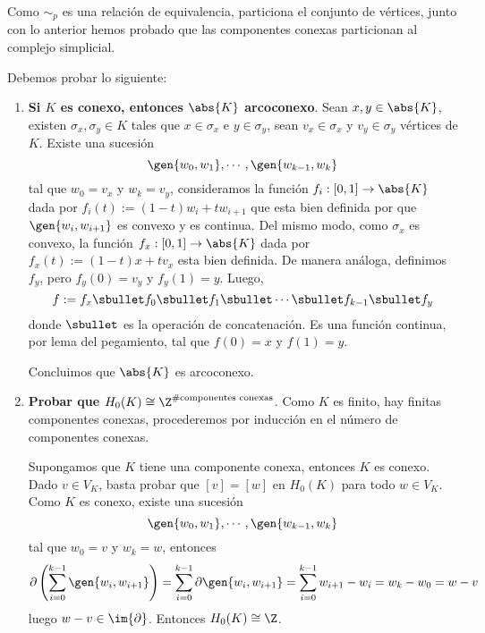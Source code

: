 \documentclass{article}
\begin{document}
\vspace{1mm}
\noindent Como $\sim_{p}$ es una relación de equivalencia, particiona el conjunto de vértices,
junto con lo anterior hemos probado que las componentes conexas particionan al complejo 
simplicial.

\vspace{2mm}
\noindent Debemos probar lo siguiente:
\begin{enumerate}
    \item\textbf{Si $K$ es conexo, entonces $\abs{K}$ arcoconexo}. Sean $x,y\in\abs{K}$, 
    existen $\sigma_{x},\sigma_{y}\in K$ tales que $x\in\sigma_{x}$ e $y\in\sigma_{y}$, sean 
    $v_{x}\in\sigma_{x}$ y $v_{y}\in\sigma_{y}$ vértices de $K$. Existe una sucesión
    \begin{equation*}
        \gen{w_{0},w_{1}},\cdots,\gen{w_{k-1},w_{k}}
    \end{equation*}
    tal que $w_{0}=v_{x}$ y $w_{k}=v_{y}$, consideramos la función $f_{i}:[0,1]\to\abs{K}$ dada 
    por $f_{i}(t):=(1-t)w_{i}+tw_{i+1}$ que esta bien definida por que $\gen{w_{i},w_{i+1}}$ es 
    convexo y es continua. Del mismo modo, como $\sigma_{x}$ es convexo, la función 
    $f_{x}:[0,1]\to\abs{K}$ dada por $f_{x}(t):=(1-t)x+tv_{x}$ esta bien definida. De manera
    análoga, definimos $f_{y}$, pero $f_{y}(0)=v_{y}$ y $f_{y}(1)=y$. Luego,
    \begin{equation*}
        f:=f_{x}\sbullet f_{0}\sbullet f_{1}\sbullet\cdots\sbullet f_{k-1}\sbullet f_{y}
    \end{equation*}
    donde $\sbullet$ es la operación de concatenación. Es una función continua, por lema del 
    pegamiento, tal que $f(0)=x$ y $f(1)=y$.
    
    \vspace{1mm}
    Concluimos que $\abs{K}$ es arcoconexo.
    
    \item\textbf{Probar que $H_{0}(K)\cong\Z^{\text{\#componentes conexas}}$}. Como $K$ es 
    finito, hay finitas componentes conexas, procederemos por inducción en el número de 
    componentes conexas.

    \vspace{1mm}
    Supongamos que $K$ tiene una componente conexa, entonces $K$ es conexo. Dado $v\in V_{K}$, 
    basta probar que $[v]=[w]$ en $H_{0}(K)$ para todo $w\in V_{K}$. Como $K$ es conexo, existe
    una sucesión
    \begin{equation*}
        \gen{w_{0},w_{1}},\cdots,\gen{w_{k-1},w_{k}}
    \end{equation*}
    tal que $w_{0}=v$ y $w_{k}=w$, entonces
    \begin{equation*}
        \partial\left(\sum_{i=0}^{k-1}\gen{w_{i},w_{i+1}}\right)
        =\sum_{i=0}^{k-1}\partial\gen{w_{i},w_{i+1}}=\sum_{i=0}^{k-1}w_{i+1}-w_{i}=w_{k}-w_{0}=w-v
    \end{equation*}
    luego $w-v\in\im{\partial}$. Entonces $H_{0}(K)\cong\Z$.


\end{enumerate}
\end{document}
